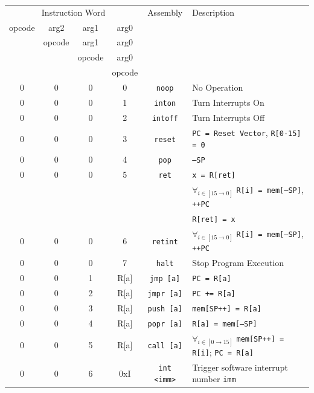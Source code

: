 \documentclass{article}
\begin{document}
\begin{table}[h!]
    \centering
    \begin{footnotesize}
        \begin{tabular}{cccc|c|l}
            \hline
            \multicolumn{4}{c|}{Instruction Word} & Assembly & Description \\
            opcode & arg2 & arg1 & arg0 & & \\
            {} & opcode & arg1 & arg0 & & \\
            {} & {} & opcode & arg0 & & \\
            {} & {} & {} & opcode & & \\
            \hline
            0 & 0 & 0 & 0 & \texttt{noop} & No Operation \\
            0 & 0 & 0 & 1 & \texttt{inton} & Turn Interrupts On \\
            0 & 0 & 0 & 2 & \texttt{intoff} & Turn Interrupts Off \\
            0 & 0 & 0 & 3 & \texttt{reset} & \texttt{PC = Reset Vector}, \texttt{R[0-15] = 0} \\
            0 & 0 & 0 & 4 & \texttt{pop} & \texttt{--SP} \\
            0 & 0 & 0 & 5 & \texttt{ret} & \texttt{x = R[ret]} \\
            {} & {} & {} & {} & {} & $\forall_{i \in [15 \rightarrow 0]}$ \texttt{R[i] = mem[--SP]}, \texttt{++PC} \\
            {} & {} & {} & {} & {} & \texttt{R[ret] = x} \\
            0 & 0 & 0 & 6 & \texttt{retint} & $\forall_{i \in [15 \rightarrow 0]}$ \texttt{R[i] = mem[--SP]}, \texttt{++PC} \\
            0 & 0 & 0 & 7 & \texttt{halt} & Stop Program Execution \\
            0 & 0 & 1 & R[a] & \texttt{jmp [a]} & \texttt{PC = R[a]} \\
            0 & 0 & 2 & R[a] & \texttt{jmpr [a]} & \texttt{PC += R[a]} \\
            0 & 0 & 3 & R[a] & \texttt{push [a]} & \texttt{mem[SP++] = R[a]} \\
            0 & 0 & 4 & R[a] & \texttt{popr [a]} & \texttt{R[a] = mem[--SP]} \\
            0 & 0 & 5 & R[a] & \texttt{call [a]} & $\forall_{i \in [0 \rightarrow 15]}$
            \texttt{mem[SP++] = R[i]}; \texttt{PC = R[a]} \\
            0 & 0 & 6 & 0xI & \texttt{int <imm>} & Trigger software interrupt number \texttt{imm} \\

\end{tabular}
\end{footnotesize}
\end{table}
\end{document}
